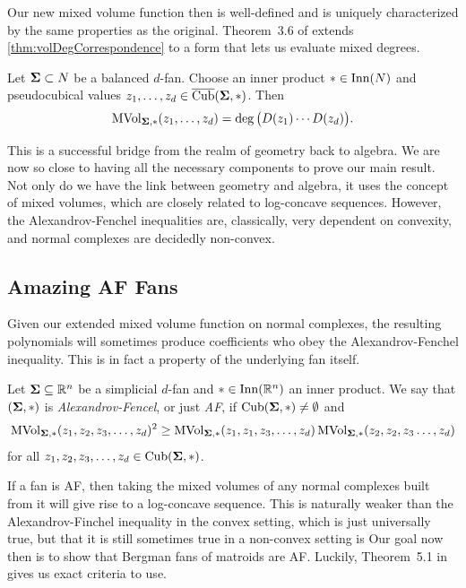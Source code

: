\documentclass[12pt,oneside]{../../sfsuthesis}
\begin{document}
Our new mixed volume function then is well-defined and is uniquely characterized by the same properties as the original.
Theorem~3.6 of \cite{nowakMixedVolumesNormal2023} extends \th\ref{thm:volDegCorrespondence} to a form that lets us evaluate mixed degrees.
\begin{theorem}\th\label{thm:mixedDeg}
    Let \( \bm{\Sigma} \subset N \) be a balanced \( d \)-fan.
    Choose an inner product \( \ast \in \operatorname{Inn}(N) \) and pseudocubical values \( z_1, \dots, z_d \in \operatorname{\overline{Cub}}( \bm{\Sigma}, \ast ) \).
    Then
    \[
        \operatorname{MVol}_{\bm{\Sigma}, \ast}(z_1, \dots, z_d) = \deg\big( D(z_1) \cdots D(z_d) \big).
    \]
\end{theorem}
This is a successful bridge from the realm of geometry back to algebra.
We are now so close to having all the necessary components to prove our main result.
Not only do we have the link between geometry and algebra, it uses the concept of mixed volumes, which are closely related to log-concave sequences.
However, the Alexandrov-Fenchel inequalities are, classically, very dependent on convexity, and normal complexes are decidedly non-convex.

\subsection{Amazing AF Fans}
Given our extended mixed volume function on normal complexes, the resulting polynomials will sometimes produce coefficients who obey the Alexandrov-Fenchel inequality.
This is in fact a property of the underlying fan itself.
\begin{definition}\th\label{def:AF}
    Let \( \bm{\Sigma} \subseteq \mathbb{R}^n \) be a simplicial \( d \)-fan and \( \ast \in \operatorname{Inn}(\mathbb{R}^n) \) an inner product.
    We say that \( (\bm{\Sigma}, \ast) \) is \emph{Alexandrov-Fencel}, or just \emph{AF}, if \( \operatorname{Cub}(\bm{\Sigma}, \ast) \neq \emptyset \) and
    \[
        \operatorname{MVol}_{\bm{\Sigma}, \ast}(z_1, z_2, z_3, \dots, z_d)^2 \geq  \operatorname{MVol}_{\bm{\Sigma}, \ast}(z_1, z_1, z_3, \dots, z_d)\operatorname{MVol}_{\bm{\Sigma}, \ast}(z_2, z_2, z_3 \dots, z_d)
    \]
    for all \( z_1, z_2, z_3, \dots, z_d \in \operatorname{Cub}(\bm{\Sigma}, \ast) \).
\end{definition}
If a fan is AF, then taking the mixed volumes of any normal complexes built from it will give rise to a log-concave sequence.
This is naturally weaker than the Alexandrov-Finchel inequality in the convex setting, which is just universally true, but that it is still sometimes true in a non-convex setting is
Our goal now then is to show that Bergman fans of matroids are AF\@.
Luckily, Theorem~5.1 in \cite{nowakMixedVolumesNormal2023} gives us exact criteria to use.
\end{document}
